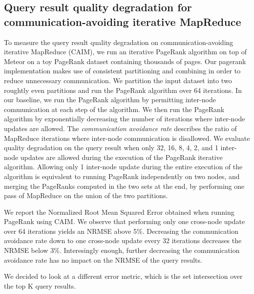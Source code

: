 \subsection{Query result quality degradation for communication-avoiding iterative MapReduce}

To measure the query result quality degradation on communication-avoiding iterative MapReduce (CAIM), we run an iterative PageRank algorithm on top of Meteor on a toy PageRank dataset containing thousands of pages. Our pagerank implementation makes use of consistent partitioning and combining in order to reduce unnecessary communication. We partition the input dataset into two roughtly even partitions and run the PageRank algorithm over 64 iterations. In our baseline, we run the PageRank algorithm by permitting inter-node communication at each step of the algorithm. We then run the PageRank algorithm by exponentially decreasing the number of iterations where inter-node updates are allowed. The \emph{communication avoidance rate} describes the ratio of MapReduce iterations where inter-node communication is disallowed. We evaluate quality degradation on the query result when only 32, 16, 8, 4, 2, and 1 inter-node updates are allowed during the execution of the PageRank iterative algorithm. Allowing only 1 inter-node update during the entire execution of the algorithm is equivalent to running PageRank independently on two nodes, and merging the PageRanks computed in the two sets at the end, by performing one pass of MapReduce on the union of the two partitions. 

We report the Normalized Root Mean Squared Error obtained when running PageRank using CAIM. We observe that performing only one cross-node update over 64 iterations yields an NRMSE above 5\%. Decreasing the communication avoidance rate down to one cross-node update every 32 iterations decreases the NRMSE below 3\%. Interesingly enough, further decreasing the communication avoidance rate has no impact on the NRMSE of the query results. 

We decided to look at a different error metric, which is the set intersection over the top K query results.

